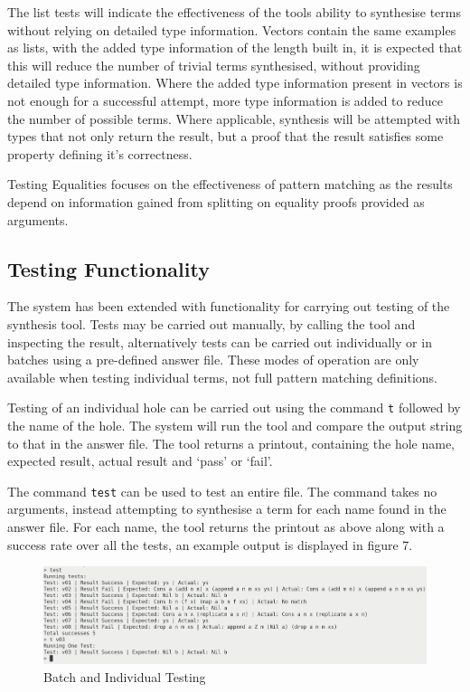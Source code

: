 \documentclass[a4paper]{article}
\begin{document}
The list tests will indicate the effectiveness of the
tools ability to synthesise terms without relying on detailed
type information. Vectors contain the same examples as lists,
with the added type information of the length built in, it is expected that
this will reduce the number of trivial terms synthesised, without providing
detailed type information. Where the added type information present in
vectors is not enough for a successful attempt, more type information is added
to reduce the number of possible terms. Where applicable, synthesis will be attempted
with types that not only return the result, but a proof that the result satisfies
some property defining it's correctness. 

Testing Equalities focuses on the effectiveness of pattern matching
as the results depend on information gained from splitting on equality proofs provided
as arguments. 


\subsection{Testing Functionality}

The system has been extended with functionality for carrying out testing
of the synthesis tool. Tests may be carried out manually,
by calling the tool and inspecting the
result, alternatively tests can be carried out individually or in batches using a
pre-defined answer file. These modes of operation are only available
when testing individual terms, not full pattern matching definitions.

Testing of an individual hole can be carried out using the 
command \texttt{t} followed by the name of the hole. The system
will run the tool and compare the output string to that in the answer file.
The tool returns a printout, containing the hole name, expected result,
actual result and `pass' or `fail'.

The command \texttt{test} can be used to test an entire file. The command takes no arguments,
instead attempting to synthesise a term for each name found in the answer file. 
For each name, the tool returns the printout as above along with a success rate over all
the tests, an example output is displayed in figure 7.

\begin{center}
\begin{figure}[htbp]
\centering
\includegraphics[scale=0.20]{./Resource/batch-test.png}
\caption{Batch and Individual Testing}
\end{figure}
\end{center}
\end{document}
